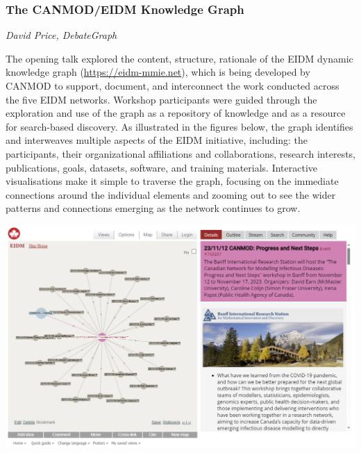 \subsubsection*{The CANMOD/EIDM Knowledge Graph}
\textit{David Price, DebateGraph}

The opening talk explored the content, structure, rationale of the EIDM dynamic knowledge graph (\url{https://eidm-mmie.net}), which is being developed by CANMOD to support, document, and interconnect the work conducted across the five EIDM networks. Workshop participants were guided through the exploration and use of the graph as a repository of knowledge and as a resource for search-based discovery. As illustrated in the figures below, the graph identifies and interweaves multiple aspects of the EIDM initiative, including: the participants, their organizational affiliations and collaborations, research interests, publications, goals, datasets, software, and training materials. Interactive visualisations make it simple to traverse the graph, focusing on the immediate connections around the individual elements and zooming out to see the wider patterns and connections emerging as the network continues to grow.

\begin{center}
\includegraphics[width=\textwidth]{talk_summaries/EIDM_CANMOD.png}
\end{center}
